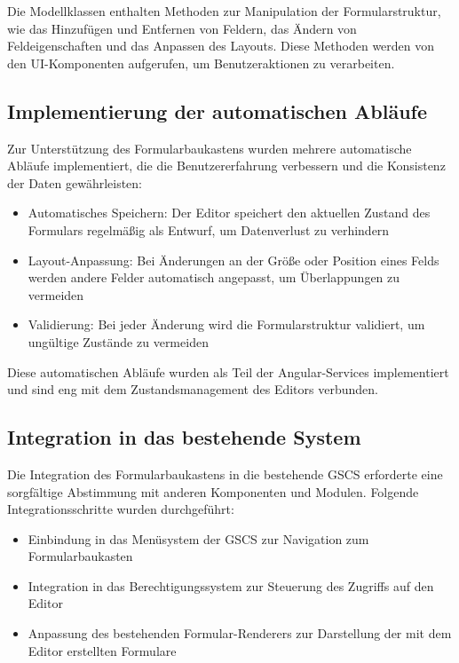 \documentclass[a4paper,11pt]{article}
\begin{document}
\noindent Die Modellklassen enthalten Methoden zur Manipulation der Formularstruktur, wie das Hinzufügen und Entfernen von Feldern, das Ändern von Feldeigenschaften und das Anpassen des Layouts. Diese Methoden werden von den UI-Komponenten aufgerufen, um Benutzeraktionen zu verarbeiten.


\subsection{Implementierung der automatischen Abläufe}
Zur Unterstützung des Formularbaukastens wurden mehrere automatische Abläufe implementiert, die die Benutzererfahrung verbessern und die Konsistenz der Daten gewährleisten:

\begin{itemize}
  \item Automatisches Speichern: Der Editor speichert den aktuellen Zustand des Formulars regelmäßig als Entwurf, um Datenverlust zu verhindern
  \item Layout-Anpassung: Bei Änderungen an der Größe oder Position eines Felds werden andere Felder automatisch angepasst, um Überlappungen zu vermeiden
  \item Validierung: Bei jeder Änderung wird die Formularstruktur validiert, um ungültige Zustände zu vermeiden
\end{itemize}

\noindent Diese automatischen Abläufe wurden als Teil der Angular-Services implementiert und sind eng mit dem Zustandsmanagement des Editors verbunden.

\subsection{Integration in das bestehende System}
Die Integration des Formularbaukastens in die bestehende GSCS erforderte eine sorgfältige Abstimmung mit anderen Komponenten und Modulen. Folgende Integrationsschritte wurden durchgeführt:

\begin{itemize}
  \item Einbindung in das Menüsystem der GSCS zur Navigation zum Formularbaukasten
  \item Integration in das Berechtigungssystem zur Steuerung des Zugriffs auf den Editor
  \item Anpassung des bestehenden Formular-Renderers zur Darstellung der mit dem Editor erstellten Formulare
\end{itemize}
\end{document}
